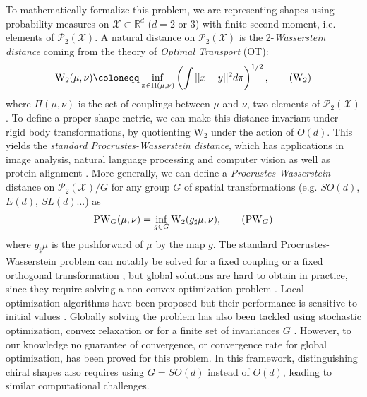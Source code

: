\documentclass{article}
\newcommand{\R}{\mathbb{R}}
\newcommand{\X}{\mathcal{X}}
\newcommand{\1}{\mathbf{1}}
\renewcommand{\P}{\mathcal{P}}
\theoremstyle{definition}
\theoremstyle{remark}
\begin{document}
To mathematically formalize this problem, we are representing shapes using probability measures on $\X \subset \R^d$ ($d=2$ or 3) with finite second moment, i.e. elements of $\P_2(\X)$. 
A natural distance on $\P_2(\X)$ is the 2-\emph{Wasserstein distance} coming from the theory of \emph{Optimal Transport} (OT):
\begin{equation}\label{eq:W2}
    \mathrm{W}_2(\mu,\nu) \coloneqq \inf_{\pi\in\Pi(\mu,\nu)}\left(\int||x-y||^2d\pi\right)^{1/2}, \tag{$\mathrm{W}_2$}
\end{equation}  
where $\Pi(\mu,\nu)$ is the set of couplings between  $\mu$ and $\nu$, two elements of $\P_2(\X)$. To define a proper shape metric, we can make this distance invariant under rigid body transformations, by quotienting $\mathrm{W}_2$ under the action of $O(d)$. This yields the  \emph{standard Procrustes-Wasserstein distance}, which has applications in image analysis, natural language processing and computer vision \cite{adamo2025depth,grave2019unsupervised,zhang2017earth} as well as protein alignment \cite{jin2021two}. More generally, we can define a  \emph{Procrustes-Wasserstein} distance on $\P_2(\X)/G$ for any group $G$ of spatial transformations (e.g. $SO(d)$, $E(d)$, $SL(d)$...) as 
\begin{equation}\label{eq:PW}
    \mathrm{PW}_G (\mu,\nu)=\inf_{g\in G} \mathrm{W}_2(g_\sharp\mu,\nu), \tag{$\mathrm{PW}_G$}
\end{equation}
where $g_\sharp\mu$ is the pushforward of $\mu$ by the map $g$. 
The standard Procrustes-Wasserstein problem can notably be solved for a fixed coupling or a fixed orthogonal transformation \cite{grave2019unsupervised}, but global solutions are hard to obtain in practice, since they require solving a non-convex optimization problem \cite{grave2019unsupervised}. Local optimization algorithms have been proposed but their performance is sensitive to initial values \cite{adamo2025depth,zhang2017earth}.    
Globally solving the problem has also been tackled using stochastic optimization, convex relaxation \cite{grave2019unsupervised} or for a finite set of invariances $G$ \cite{pal2025wasserstein}. However, to our knowledge  no  guarantee of convergence, or convergence rate for global optimization, has been proved for this problem. In this framework, distinguishing chiral shapes also requires using $G=SO(d)$ instead of $O(d)$, leading to similar computational challenges. 
\end{document}
